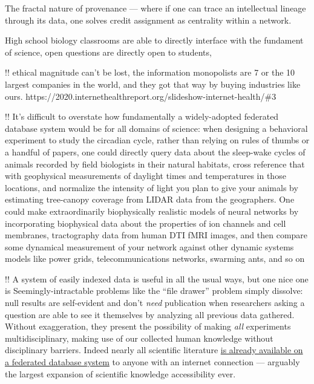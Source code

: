 \documentclass[10pt]{article}
\begin{document}
\begin{multicols}{2}
The fractal nature of provenance --- where if one can trace an
intellectual lineage through its data, one solves credit assignment as
centrality within a network.

High school biology classrooms are able to directly interface with the
fundament of science, open questions are directly open to students,

!! ethical magnitude can't be lost, the information monopolists are 7 or
the 10 largest companies in the world, and they got that way by buying
industries like ours.
https://2020.internethealthreport.org/slideshow-internet-health/\#3

!! It's difficult to overstate how fundamentally a widely-adopted
federated database system would be for all domains of science: when
designing a behavioral experiment to study the circadian cycle, rather
than relying on rules of thumbs or a handful of papers, one could
directly query data about the sleep-wake cycles of animals recorded by
field biologists in their natural habitats, cross reference that with
geophysical measurements of daylight times and temperatures in those
locations, and normalize the intensity of light you plan to give your
animals by estimating tree-canopy coverage from LIDAR data from the
geographers. One could make extraordinarily biophysically realistic
models of neural networks by incorporating biophysical data about the
properties of ion channels and cell membranes, tractography data from
human DTI fMRI images, and then compare some dynamical measurement of
your network against other dynamic systems models like power grids,
telecommunications networks, swarming ants, and so on

!! A system of easily indexed data is useful in all the usual ways, but
one nice one is Seemingly-intractable problems like the ``file drawer''
problem simply dissolve: null results are self-evident and don't
\emph{need} publication when researchers asking a question are able to
see it themselves by analyzing all previous data gathered. Without
exaggeration, they present the possibility of making \emph{all}
experiments multidisciplinary, making use of our collected human
knowledge without disciplinary barriers. Indeed nearly all scientific
literature \href{https://freeread.org/ipfs/}{is already available on a
federated database system} to anyone with an internet connection ---
arguably the largest expansion of scientific knowledge accessibility
ever. 
\end{multicols}
\end{document}
